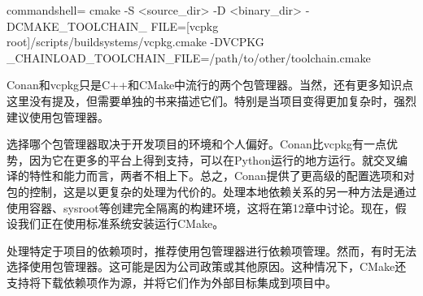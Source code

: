 \begin{tcblisting}{commandshell={}}
cmake -S <source_dir> -D <binary_dir> -DCMAKE_TOOLCHAIN_
  FILE=[vcpkg root]/scripts/buildsystems/vcpkg.cmake -DVCPKG
  _CHAINLOAD_TOOLCHAIN_FILE=/path/to/other/toolchain.cmake
\end{tcblisting}

Conan和vcpkg只是C++和CMake中流行的两个包管理器。当然，还有更多知识点这里没有提及，但需要单独的书来描述它们。特别是当项目变得更加复杂时，强烈建议使用包管理器。

选择哪个包管理器取决于开发项目的环境和个人偏好。Conan比vcpkg有一点优势，因为它在更多的平台上得到支持，可以在Python运行的地方运行。就交叉编译的特性和能力而言，两者不相上下。总之，Conan提供了更高级的配置选项和对包的控制，这是以更复杂的处理为代价的。处理本地依赖关系的另一种方法是通过使用容器、sysroot等创建完全隔离的构建环境，这将在第12章中讨论。现在，假设我们正在使用标准系统安装运行CMake。

处理特定于项目的依赖项时，推荐使用包管理器进行依赖项管理。然而，有时无法选择使用包管理器。这可能是因为公司政策或其他原因。这种情况下，CMake还支持将下载依赖项作为源，并将它们作为外部目标集成到项目中。




